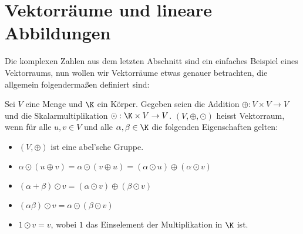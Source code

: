 \documentclass[letterpaper,10pt,english]{jupyterBook}
\begin{document}
\chapter{Vektorräume und lineare Abbildungen}
\label{\detokenize{vektorraeume/vektorraeume:vektorraume-und-lineare-abbildungen}}\label{\detokenize{vektorraeume/vektorraeume::doc}}
Die komplexen Zahlen aus dem letzten Abschnitt sind ein einfaches Beispiel eines Vektorraums, nun wollen wir Vektorräume etwas genauer betrachten, die allgemein folgendermaßen definiert sind:
\label{vektorraeume/vektorraeume:definition-0}
\begin{definition}{}{}



Sei \(V\) eine Menge und \(\K\) ein Körper. Gegeben seien die Addition \(\oplus: V \times V \rightarrow V\) und die Skalarmultiplikation \(\odot: \K \times V \rightarrow V\). \((V,\oplus,\odot)\) heisst Vektorraum, wenn für alle \(u,v \in V\) und alle \(\alpha, \beta \in \K\) die folgenden Eigenschaften gelten:
\begin{itemize}
\item {} 
\((V,\oplus)\) ist eine abel’sche Gruppe.

\item {} 
\(\alpha \odot (u \oplus v) = \alpha \odot(v \oplus u) = (\alpha \odot u) \oplus (\alpha \odot v)\)

\item {} 
\((\alpha + \beta) \odot v = (\alpha \odot v) \oplus (\beta \odot v)\)

\item {} 
\((\alpha \beta)\odot v = \alpha \odot (\beta \odot v)\)

\item {} 
\(1 \odot v = v\), wobei \(1\) das Einselement der Multiplikation in \(\K\) ist.

\end{itemize}
\end{definition}
\end{document}

